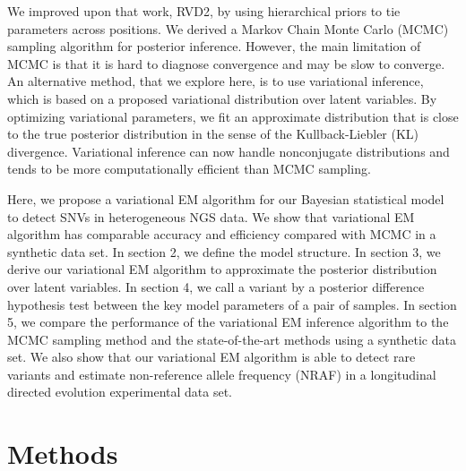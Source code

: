 \documentclass{bmcart}
\begin{document}
We improved upon that work, RVD2, by using hierarchical priors to tie parameters across positions\cite{he2015rvd2}.
We derived a Markov Chain Monte Carlo (MCMC) sampling algorithm for posterior inference.
However, the main limitation of MCMC is that it is hard to diagnose convergence and may be slow to converge\cite{jordan1999introduction}.
An alternative method, that we explore here, is to use variational inference, which is based on a proposed variational distribution over latent variables.
By optimizing variational parameters, we fit an approximate distribution that is close to the true posterior distribution in the sense of the Kullback-Liebler (KL) divergence.
Variational inference can now handle nonconjugate distributions and tends to be more computationally efficient than MCMC sampling\cite{peterson1989explorations}.

Here, we propose a variational EM algorithm for our Bayesian statistical model to detect SNVs in heterogeneous NGS data.
We show that variational EM algorithm has comparable accuracy and efficiency compared with MCMC in a synthetic data set.
In section 2, we define the model structure.
In section 3, we derive our variational EM algorithm to approximate the posterior distribution over latent variables.
In section 4, we call a variant by a posterior difference hypothesis test between the key model parameters of a pair of samples.
In section 5, we compare the performance of the variational EM inference algorithm to the MCMC sampling method and the state-of-the-art methods using a synthetic data set.
We also show that our variational EM algorithm is able to detect rare variants and estimate non-reference allele frequency (NRAF) in a longitudinal directed evolution experimental data set.

\section*{Methods}
\end{document}
